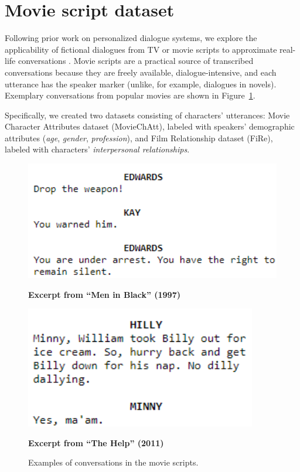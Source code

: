 \section{Movie script dataset}
\label{fire}

Following prior work on personalized dialogue systems, we explore the applicability of fictional dialogues from TV or movie scripts to approximate real-life conversations \cite{li2016persona, lin2011all}. Movie scripts are a practical source of transcribed conversations because they are freely available, dialogue-intensive, and each utterance has the speaker marker (unlike, for example, dialogues in novels). Exemplary conversations from popular movies are shown in Figure~\ref{fig:movie-script}. 

Specifically, we created two datasets consisting of characters' utterances: Movie Character Attributes dataset (MovieChAtt), labeled with speakers' demographic attributes (\textit{age}, \textit{gender}, \textit{profession}), and Film Relationship dataset (FiRe), labeled with characters' \textit{interpersonal relationships}.

\begin{figure}[h!]
\RawFloats
\centering
\begin{minipage}[t]{0.47\textwidth}
\centering
\includegraphics[width=1.0\textwidth]{data/pics/men in black.png}
\vspace*{-3mm}
\caption*{{\small \textbf{Excerpt from ``Men in Black'' (1997)}}}
\label{fig:2figsA}
\end{minipage}
\qquad
\begin{minipage}[t]{0.45\textwidth}
\includegraphics[width=0.9\textwidth]{data/pics/the help.png}
\vspace*{2mm}
\caption*{{\small \textbf{Excerpt from ``The Help'' (2011)}}}
\label{fig:2figsB}
\end{minipage}
\caption{Examples of conversations in the movie scripts.}
\label{fig:movie-script}
\end{figure}


